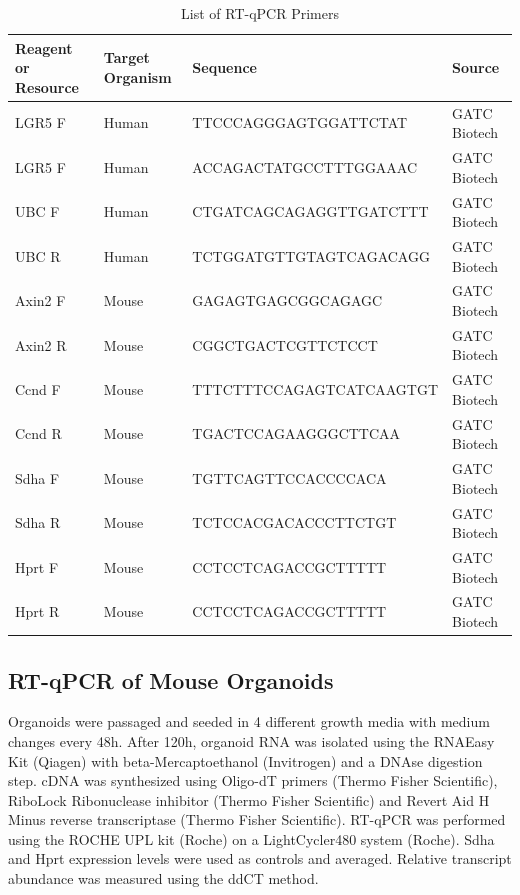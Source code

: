 \begin{flushleft}
\begin{table}[htb]
\caption{List of RT-qPCR Primers}
\label{tab:oligonucleotides} %
\begin{tabularx}{\textwidth}{XlX}
\toprule
\textbf{Reagent or Resource} & \textbf{Target Organism} & \textbf{Sequence} & \textbf{Source} \\
\midrule
LGR5 F & Human & TTCCCAGGGAGTGGATTCTAT & GATC Biotech \\
LGR5 F & Human & ACCAGACTATGCCTTTGGAAAC & GATC Biotech \\
UBC F & Human & CTGATCAGCAGAGGTTGATCTTT & GATC Biotech \\
UBC R & Human & TCTGGATGTTGTAGTCAGACAGG & GATC Biotech \\
Axin2 F & Mouse & GAGAGTGAGCGGCAGAGC & GATC Biotech \\
Axin2 R & Mouse & CGGCTGACTCGTTCTCCT & GATC Biotech \\
Ccnd F & Mouse & TTTCTTTCCAGAGTCATCAAGTGT & GATC Biotech \\
Ccnd R & Mouse & TGACTCCAGAAGGGCTTCAA & GATC Biotech \\
Sdha F & Mouse & TGTTCAGTTCCACCCCACA & GATC Biotech \\
Sdha R & Mouse & TCTCCACGACACCCTTCTGT & GATC Biotech \\
Hprt F & Mouse & CCTCCTCAGACCGCTTTTT & GATC Biotech \\
Hprt R & Mouse & CCTCCTCAGACCGCTTTTT & GATC Biotech \\
\bottomrule
\end{tabularx}
\end{table}

\subsection{RT-qPCR of Mouse Organoids}
Organoids were passaged and seeded in 4 different growth media with medium changes every 48h. After 120h, organoid RNA was isolated using the RNAEasy Kit (Qiagen) with beta-Mercaptoethanol (Invitrogen) and a DNAse digestion step. cDNA was synthesized using Oligo-dT primers (Thermo Fisher Scientific), RiboLock Ribonuclease inhibitor (Thermo Fisher Scientific) and Revert Aid H Minus reverse transcriptase (Thermo Fisher Scientific). RT-qPCR was performed using the ROCHE UPL kit (Roche) on a LightCycler480 system (Roche). Sdha and Hprt expression levels were used as controls and averaged. Relative transcript abundance was measured using the ddCT method.
 

\end{flushleft}
